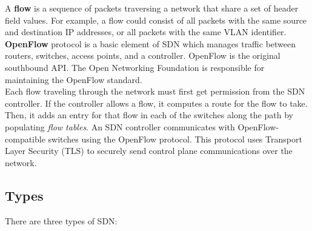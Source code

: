 A \textbf{flow} is a sequence of packets traversing a network that share a set of header field values. For example, a flow could consist of all packets with the same source and destination IP addresses, or all packets with the same VLAN identifier.\\

\textbf{OpenFlow} protocol is a basic element of SDN which manages traffic between routers, switches, access points, and a controller. OpenFlow is the original southbound API. The Open Networking Foundation is responsible for maintaining the OpenFlow standard.\\

Each flow traveling through the network must first get permission from the SDN controller. If the controller allows a flow, it computes a route for the flow to take. Then, it adds an entry for that flow in each of the switches along the path by populating \emph{flow tables}. An SDN controller communicates with OpenFlow-compatible switches using the OpenFlow protocol. This protocol uses Transport Layer Security (TLS) to securely send control plane communications over the network.

\subsection{Types}

There are three types of SDN:


